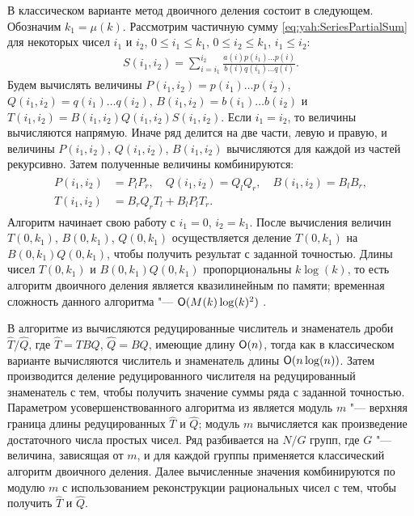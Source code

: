 В классическом варианте метод двоичного деления состоит в следующем.
Обозначим $k_1=\mu(k)$. Рассмотрим частичную сумму \eqref{eq:yah:SeriesPartialSum}
для некоторых чисел $i_1$ и $i_2$, $0\le i_1 \le k_1$, $0\le i_2 \le k_1$,
$i_1\le i_2$:
\begin{align}
S(i_1,i_2)=\sum_{i=i_1}^{i_2}{\frac{a(i)p(i_1)
\ldots p(i)}{b(i)q(i_1)\ldots q(i)}}.
\label{eq:yah:Seriesi1i2Sum}
\end{align}
Будем вычислять величины $P(i_1,i_2)=p(i_1)\ldots p(i_2)$,
$Q(i_1,i_2)=q(i_1)\ldots q(i_2)$, $B(i_1,i_2)=b(i_1)\ldots b(i_2)$
и $T(i_1,i_2)=B(i_1,i_2)Q(i_1,i_2)S(i_1,i_2)$. Если $i_1=i_2$, то величины
вычисляются напрямую. Иначе ряд делится на две части, левую и правую,
и величины $P(i_1,i_2)$, $Q(i_1,i_2)$, $B(i_1,i_2)$ вычисляются для каждой
из частей рекурсивно. Затем полученные величины комбинируются:
\begin{align}
\begin{split}
P(i_1,i_2)&=P_l P_r,\quad Q(i_1,i_2)=Q_l Q_r,\quad B(i_1,i_2)=B_l B_r,\\
T(i_1,i_2)&=B_r Q_r T_l + B_l P_l T_r.
\end{split}
\label{eq:yah:PQBTCalculation}
\end{align}
Алгоритм начинает свою работу с $i_1=0$, $i_2=k_1$. После вычисления
величин $T(0,k_1)$, $B(0,k_1)$, $Q(0,k_1)$ осуществляется деление $T(0,k_1)$
на $B(0,k_1)Q(0,k_1)$, чтобы получить результат с заданной точностью.
Длины чисел $T(0,k_1)$ и $B(0,k_1)Q(0,k_1)$ пропорциональны
$k\log(k)$, то есть алгоритм двоичного деления является квазилинейным
по памяти; временная сложность данного алгоритма "--- ${\sf O}(M(k)\log(k)^2)$
\cite{yakhontov:bib:Haible}.

\smallskip

В алгоритме из \cite{yakhontov:bib:Cheng} вычисляются редуцированные
числитель и знаменатель
дроби ${\widehat{T}}/{\widehat{Q}}$, где $\widehat{T}=TBQ$,
$\widehat{Q}=BQ$, имеющие длину ${\sf O}(n)$, тогда как в классическом
варианте вычисляются числитель и знаменатель длины ${\sf O}(n\log(n))$.
Затем производится деление редуцированного числителя на редуцированный
знаменатель с тем, чтобы получить значение суммы ряда с заданной
точностью. Параметром усовершенствованного алгоритма из
\cite{yakhontov:bib:Cheng} является модуль $m$ "--- верхняя граница
длины редуцированных $\widehat{T}$ и $\widehat{Q}$; модуль $m$
вычисляется как произведение достаточного числа простых чисел.
Ряд разбивается на $N/G$ групп, где $G$ "--- величина, зависящая от
$m$, и для каждой группы применяется классический алгоритм двоичного
деления. Далее вычисленные значения комбинируются по модулю $m$ с
использованием реконструкции рациональных чисел с тем, чтобы
получить $\widehat{T}$ и $\widehat{Q}$.

